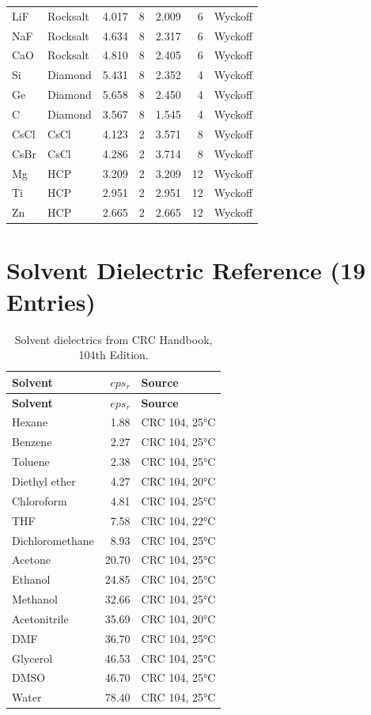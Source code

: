\documentclass[11pt,twoside]{article}
\def\varepsilon{eps}%
\begin{document}
\begin{longtable}{llrrrrl}
LiF  & Rocksalt & 4.017 & 8 & 2.009 & 6  & Wyckoff \\
NaF  & Rocksalt & 4.634 & 8 & 2.317 & 6  & Wyckoff \\
CaO  & Rocksalt & 4.810 & 8 & 2.405 & 6  & Wyckoff \\
Si   & Diamond  & 5.431 & 8 & 2.352 & 4  & Wyckoff \\
Ge   & Diamond  & 5.658 & 8 & 2.450 & 4  & Wyckoff \\
C    & Diamond  & 3.567 & 8 & 1.545 & 4  & Wyckoff \\
CsCl & CsCl     & 4.123 & 2 & 3.571 & 8  & Wyckoff \\
CsBr & CsCl     & 4.286 & 2 & 3.714 & 8  & Wyckoff \\
Mg   & HCP      & 3.209 & 2 & 3.209 & 12 & Wyckoff \\
Ti   & HCP      & 2.951 & 2 & 2.951 & 12 & Wyckoff \\
Zn   & HCP      & 2.665 & 2 & 2.665 & 12 & Wyckoff \\
\bottomrule
\end{longtable}


\section{Solvent Dielectric Reference (19 Entries)}
\label{app:solvents}

\begin{longtable}{lrl}
\caption{Solvent dielectrics from CRC Handbook, 104th Edition.} \\
\toprule
\textbf{Solvent} & $\varepsilon_r$ & \textbf{Source} \\
\midrule
\endfirsthead
\toprule
\textbf{Solvent} & $\varepsilon_r$ & \textbf{Source} \\
\midrule
\endhead
Hexane          & 1.88  & CRC 104, 25°C \\
Benzene         & 2.27  & CRC 104, 25°C \\
Toluene         & 2.38  & CRC 104, 25°C \\
Diethyl ether   & 4.27  & CRC 104, 20°C \\
Chloroform      & 4.81  & CRC 104, 25°C \\
THF             & 7.58  & CRC 104, 22°C \\
Dichloromethane & 8.93  & CRC 104, 25°C \\
Acetone         & 20.70 & CRC 104, 25°C \\
Ethanol         & 24.85 & CRC 104, 25°C \\
Methanol        & 32.66 & CRC 104, 25°C \\
Acetonitrile    & 35.69 & CRC 104, 20°C \\
DMF             & 36.70 & CRC 104, 25°C \\
Glycerol        & 46.53 & CRC 104, 25°C \\
DMSO            & 46.70 & CRC 104, 25°C \\
Water           & 78.40 & CRC 104, 25°C \\
\bottomrule
\end{longtable}
\end{document}
